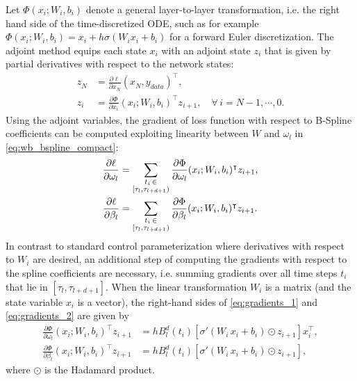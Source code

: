 \documentclass[12pt]{amsart}
\begin{document}
    Let $\Phi(x_i; W_i, b_i)$ denote a general layer-to-layer transformation, i.e. the right hand side of the time-discretized ODE, such as for example $\Phi(x_i;W_i,b_i) = x_i + h\sigma(W_i x_i + b_i)$ for a forward Euler discretization. The adjoint method equips each state $x_i$ with an adjoint state $z_i$ that is given by partial derivatives with respect to the network states:
    \begin{align}
        z_N^{ } &= \frac{\partial \ell}{\partial x_N^{ }}(x_N^{ },y_{data})^\intercal \label{eq:last_adjoint}, \\
        z_i &= \frac{\partial \Phi}{\partial x_i}(x_i;W_i,b_i)^\intercal z_{i+1}, \quad \forall\, i = N-1,\cdots,0. \label{eq:adjoint}
    \end{align}
    Using the adjoint variables, the gradient of loss function with respect to B-Spline coefficients can be computed exploiting linearity between $W$ and $\omega_l$ in \eqref{eq:wb_bspline_compact}:
    \begin{align}
        \frac{\partial \ell}{\partial \omega_l} &= \sum_{\substack{t_i\, \in \\ [\tau_l,\tau_{l+d+1})}}\frac{\partial \Phi}{\partial \omega_l}(x_i;W_i,b_i)^\intercal z_{i+1}, \label{eq:gradients_1} \\
        \frac{\partial \ell}{\partial \beta_l} &= \sum_{\substack{ t_i\, \in \\ [\tau_l, \tau_{l+d+1})}}\frac{\partial \Phi}{\partial \beta_l}(x_i;W_i,b_i)^\intercal z_{i+1}. \label{eq:gradients_2}
    \end{align}
    In contrast to standard control parameterization where derivatives with respect to $W_i$ are desired, an additional step of computing the gradients with respect to the spline coefficients are necessary, i.e. summing gradients over all time steps $t_i$ that lie in $[\tau_l, \tau_{l+d+1}]$.
   When the linear transformation $W_i$ is a matrix (and the state variable $x_i$ is a vector), the right-hand sides of \eqref{eq:gradients_1} and \eqref{eq:gradients_2} are given by
    \begin{align}
    \label{eq:coeff_gradients}
        \frac{\partial \Phi}{\partial \omega_l}(x_i;W_i,b_i)^\intercal z_{i+1} &= h B_l^d(t_i)[\sigma'(W_i\, x_i + b_i) \odot z_{i+1}]x_i^\intercal, \\
        \frac{\partial \Phi}{\partial \beta_l}(x_i;W_i,b_i)^\intercal z_{i+1}  &= h B_l^d(t_i)[\sigma'(W_i\, x_i + b_i) \odot z_{i+1}],
    \end{align}
    where $\odot$ is the Hadamard product.
\end{document}
